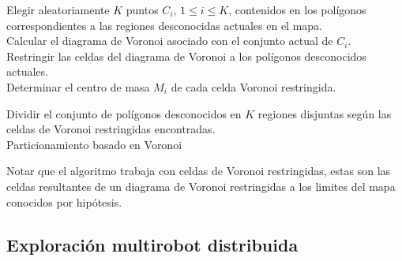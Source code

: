 \begin{algorithm}
\SetAlgoLined
    Elegir aleatoriamente $K$ puntos $C_i$, $1 \leq i \leq K$, contenidos en los polígonos correspondientes a las regiones desconocidas actuales en el mapa.\\
    Calcular el diagrama de Voronoi asociado con el conjunto actual de $C_i$.\\
    Restringir las celdas del diagrama de Voronoi a los polígonos desconocidos actuales.\\
    Determinar el centro de masa $M_i$ de cada celda Voronoi restringida.\\
    
    Dividir el conjunto de polígonos desconocidos en $K$ regiones disjuntas según las celdas de Voronoi restringidas encontradas.\\
    \caption{Particionamiento basado en Voronoi}
    \label{alg:particionamientovoronoi}
    
\end{algorithm}

Notar que el algoritmo trabaja con celdas de Voronoi restringidas, estas son las celdas resultantes de un diagrama de Voronoi restringidas a los limites del mapa conocidos por hipótesis.



\subsection{Exploración multirobot distribuida} 

